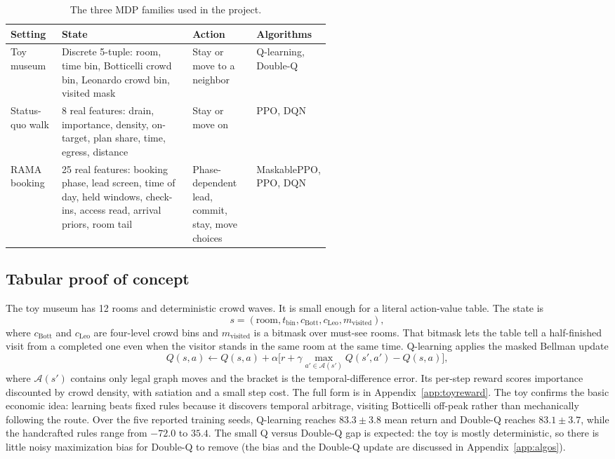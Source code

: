 \documentclass[11pt]{article}
\newcommand{\Acal}{\mathcal{A}}
\begin{document}
\begin{table}[t]
\centering
\small
\caption{The three MDP families used in the project.}
\label{tab:mdps}
\begin{tabularx}{\linewidth}{@{}P{0.16\linewidth}Y P{0.20\linewidth}P{0.17\linewidth}@{}}
\toprule
Setting & State & Action & Algorithms \\
\midrule
Toy museum &
Discrete 5-tuple: room, time bin, Botticelli crowd bin, Leonardo crowd bin, visited mask &
Stay or move to a neighbor &
Q-learning, Double-Q \\
Status-quo walk &
8 real features: drain, importance, density, on-target, plan share, time, egress, distance &
Stay or move on &
PPO, DQN \\
RAMA booking &
25 real features: booking phase, lead screen, time of day, held windows, check-ins, access read,
arrival priors, room tail &
Phase-dependent lead, commit, stay, move choices &
MaskablePPO, PPO, DQN \\
\bottomrule
\end{tabularx}
\end{table}

\subsection{Tabular proof of concept}

The toy museum has 12 rooms and deterministic crowd waves. It is small enough for a literal
action-value table. The state is
\[
s=(\text{room},t_{\text{bin}},c_{\text{Bott}},c_{\text{Leo}},m_{\text{visited}}),
\]
where $c_{\text{Bott}}$ and $c_{\text{Leo}}$ are four-level crowd bins and $m_{\text{visited}}$ is a
bitmask over must-see rooms. That bitmask lets the table tell a half-finished visit from a completed
one even when the visitor stands in the same room at the same time. Q-learning applies the masked
Bellman update
\[
Q(s,a)\leftarrow Q(s,a)+\alpha\Big[
r+\gamma\max_{a'\in \Acal(s')}Q(s',a')-Q(s,a)\Big],
\]
where $\Acal(s')$ contains only legal graph moves and the bracket is the temporal-difference error.
Its per-step reward scores importance discounted by crowd density, with satiation and a small step
cost. The full form is in Appendix~\ref{app:toyreward}. The toy confirms the basic economic idea:
learning beats fixed rules because it discovers temporal arbitrage, visiting Botticelli off-peak rather
than mechanically following the route. Over the five reported training seeds, Q-learning reaches
$83.3\pm3.8$ mean return and Double-Q reaches
$83.1\pm3.7$, while the handcrafted rules range from $-72.0$ to $35.4$. The small Q versus Double-Q
gap is expected: the toy is mostly deterministic, so there is little noisy maximization bias for
Double-Q to remove (the bias and the Double-Q update are discussed in Appendix~\ref{app:algos}).
\end{document}
